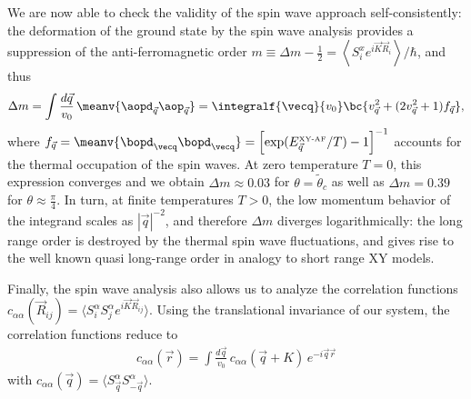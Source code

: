 We are now able to check the validity of the spin wave approach self-consistently: the deformation of the ground state by the spin wave analysis
provides a suppression of the anti-ferromagnetic order $ m \equiv  \Delta m - \frac{1}{2}=\left\langle S^x_i e^{i {\vec K} {\vec R_i}} \right\rangle / \hbar$,
and thus
%
\begin{align}
    \Delta m= \int \frac{d{\vec q}}{v_0} \, \meanv{ \aopd_{\vec q} \aop_{\vec q} } = \integralf{\vecq}{v_0}  \bc{ v_{\vec q}^2 + (2 v_{\vec q}^2 + 1) f_{\vec q} },
\end{align}
%
where $f_{\vec q} = \meanv{ \bopd_\vecq \bopd_\vecq } = \left[\exp(E^{\mbox{\tiny XY-AF}}_{\vec q}/ T)-1\right]^{-1}$ accounts for the thermal occupation of the spin waves. At zero temperature $T=0$, this expression converges and  we obtain $\Delta m \approx 0.03$ for $\theta = \tilde\theta_c$ as well as $\Delta m = 0.39$ for $\theta \approx \frac{\pi}{4}$. In turn, at finite temperatures $T>0$, the low momentum behavior of  the integrand scales as $|{\vec q}|^{-2}$, and therefore $\Delta m$ diverges logarithmically: the long range order is destroyed by the thermal spin wave fluctuations, and gives rise to the well known
quasi long-range order in analogy to short range XY models.

Finally, the spin wave analysis also allows us to analyze the correlation functions
 $c_{\alpha\alpha}({\vec R}_{ij})=\langle S^\alpha_i S^\alpha_{j} e^{i {\vec K} {\vec R}_{i j}} \rangle$. Using
 the translational invariance of our system, the correlation functions reduce to
%
\begin{align} \label{correlationFunction}
c_{\alpha\alpha}({\vec r}) = \int \frac{d{\vec q}}{v_0} \, c_{\alpha\alpha}({\vec q+K}) \, e^{-i {\vec q} {\vec r}}
\end{align}
%
with $c_{\alpha\alpha}({\vec q}) = \langle S^\alpha_{\vec q} S^\alpha_{-\vec{q}}\rangle$.
